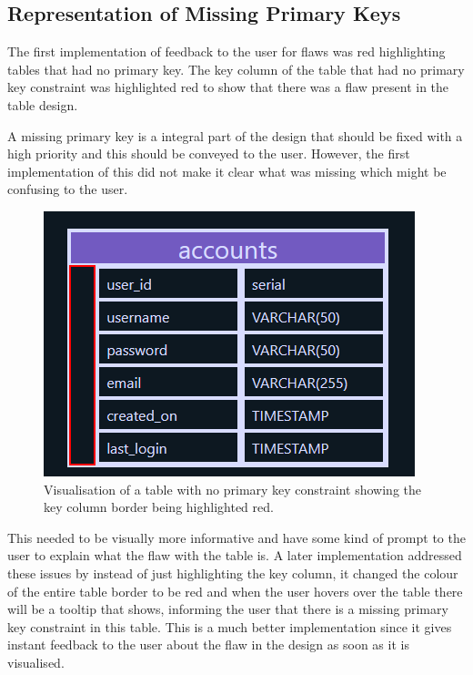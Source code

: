 \subsection{Representation of Missing Primary Keys}

The first implementation of feedback to the user for flaws was red highlighting tables that had no primary key. The key column of the table that had no primary key constraint was highlighted red to show that there was a flaw present in the table design.

A missing primary key is a integral part of the design that should be fixed with a high priority and this should be conveyed to the user. However, the first implementation of this did not make it clear what was missing which might be confusing to the user.

\begin{figure}[h!]
	\centering
	\includegraphics[scale = 0.8]{missingFK}
	\caption{Visualisation of a table with no primary key constraint showing the key column border being highlighted red.}
	\label{fig:missingFK}
\end{figure}

This needed to be visually more informative and have some kind of prompt to the user to explain what the flaw with the table is. A later implementation addressed these issues by instead of just highlighting the key column, it changed the colour of the entire table border to be red and when the user hovers over the table there will be a tooltip that shows, informing the user that there is a missing primary key constraint in this table. This is a much better implementation since it gives instant feedback to the user about the flaw in the design as soon as it is visualised. 

